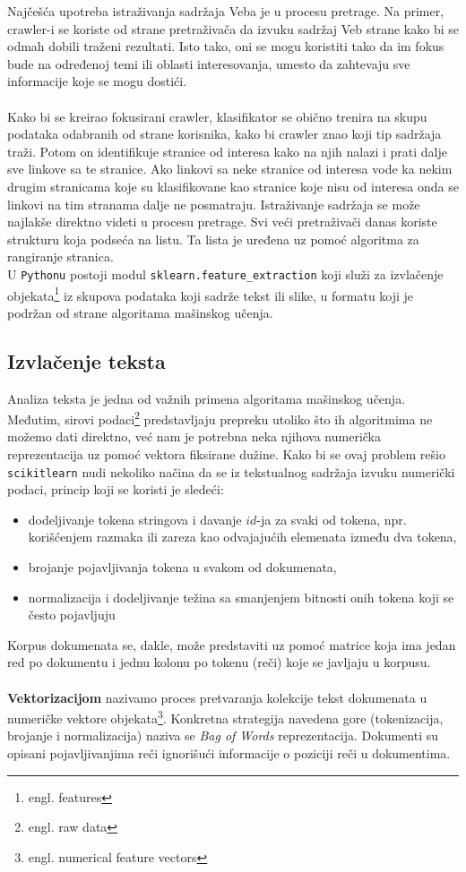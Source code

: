 \documentclass[a4paper]{article}
\begin{document}
Najčešća upotreba istraživanja sadržaja Veba je u procesu pretrage. Na primer, crawler-i se koriste od strane pretraživača da izvuku sadržaj Veb strane kako bi se odmah dobili traženi rezultati. Isto tako, oni se mogu koristiti tako da im fokus bude na određenoj temi ili oblasti interesovanja, umesto da zahtevaju sve informacije koje se mogu dostići.\\\\
Kako bi se kreirao fokusirani crawler, klasifikator se obično trenira na skupu podataka odabranih od strane korisnika, kako bi crawler znao koji tip sadržaja traži. Potom on identifikuje stranice od interesa kako na njih nalazi i prati dalje sve linkove sa te stranice. Ako linkovi sa neke stranice od interesa vode ka nekim drugim stranicama koje su klasifikovane kao stranice koje nisu od interesa onda se linkovi na tim stranama dalje ne posmatraju. Istraživanje sadržaja se može najlakše direktno videti u procesu pretrage. Svi veći pretraživači danas koriste strukturu koja podseća na listu. Ta lista je uređena uz pomoć algoritma za rangiranje stranica.\\

U \texttt{Pythonu} postoji modul \texttt{sklearn.feature\_extraction} koji služi za izvlačenje objekata\footnote{engl. features} iz skupova podataka koji sadrže tekst ili slike, u formatu koji je podržan od strane algoritama mašinskog učenja. 

\subsection{Izvlačenje teksta}

Analiza teksta je jedna od važnih primena algoritama mašinskog učenja. Međutim, sirovi podaci\footnote{engl. raw data} predstavljaju prepreku utoliko što ih algoritmima ne možemo dati direktno, već nam je potrebna neka njihova numerička reprezentacija uz pomoć vektora fiksirane dužine. Kako bi se ovaj problem rešio \texttt{scikit\-learn} nudi nekoliko načina da se iz tekstualnog sadržaja izvuku numerički podaci, princip koji se koristi je sledeći:
\begin{itemize}
\item dodeljivanje tokena stringova i davanje $id$-ja za svaki od tokena, npr. korišćenjem razmaka ili zareza kao odvajajućih elemenata između dva tokena,
\item brojanje pojavljivanja tokena u svakom od dokumenata,
\item normalizacija i dodeljivanje težina sa smanjenjem bitnosti onih tokena koji se često pojavljuju
\end{itemize}
Korpus dokumenata se, dakle, može predstaviti uz pomoć matrice koja ima jedan red po dokumentu i jednu kolonu po tokenu (reči) koje se javljaju u korpusu.\\\\
\textbf{Vektorizacijom} nazivamo proces pretvaranja kolekcije tekst dokumenata u numeričke vektore objekata\footnote{engl. numerical feature vectors}. Konkretna strategija navedena gore (tokenizacija, brojanje i normalizacija) naziva se \textit{Bag of Words} reprezentacija. Dokumenti su opisani pojavljivanjima reči ignorišući informacije o poziciji reči u dokumentima.\\
\end{document}
